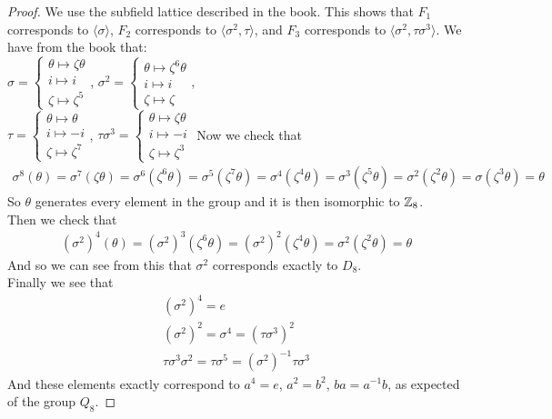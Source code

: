 \documentclass[num=11,duedate=04-21-21,course=Algebra\ II,proflastname=Walton]{hwtemplate}
\begin{document}
\begin{proof}

	We use the subfield lattice described in the book. This shows that $F_1$ corresponds to $\langle\sigma\rangle$, $F_2$ corresponds to $\langle\sigma^2, \tau\rangle$, and $F_3$ corresponds to $\langle\sigma^2, \tau\sigma^3\rangle$. We have from the book that:\\
$\sigma = \begin{cases}
    \theta \mapsto \zeta\theta\\
    i \mapsto i\\
    \zeta \mapsto \zeta^5
\end{cases}$, $\sigma^2 = \begin{cases}
    \theta \mapsto \zeta^6\theta\\
    i \mapsto i\\
    \zeta \mapsto \zeta
\end{cases}$, \\
$\tau = \begin{cases}
    \theta \mapsto \theta\\
    i \mapsto -i\\
    \zeta \mapsto \zeta^7
\end{cases}$, $\tau\sigma^3 = \begin{cases}
    \theta \mapsto \zeta\theta\\
    i \mapsto -i\\
    \zeta \mapsto \zeta^3
\end{cases}$
Now we check that
\begin{align*}
	\sigma^{8}(\theta ) = \sigma^{7}(\zeta \theta ) = \sigma ^{6}(\zeta^{6}\theta ) = \sigma^{5}(\zeta^{7}\theta )= \sigma^{4}(\zeta^{4}\theta ) = \sigma^{3}(\zeta^{5}\theta ) = \sigma^2(\zeta^2 \theta ) = \sigma ( \zeta^{3}\theta ) = \theta 
\end{align*}
So \(\theta \) generates every element in the group and it is then isomorphic to \(\mathbb{Z}_8\).\\

Then we check that
\begin{align*}
	(\sigma^2)^{4}(\theta ) = (\sigma ^2)^{3}(\zeta^{6}\theta) = (\sigma ^2)^2(\zeta ^{4}\theta ) = \sigma ^2(\zeta ^2 \theta ) = \theta 
\end{align*}
And so we can see from this that \(\sigma^2\) corresponds exactly to \(D_8\).\\

Finally we see that
\begin{align*}
	(\sigma^2)^{4} = e\\
	(\sigma ^2)^2 = \sigma^{4} = (\tau \sigma^3)^2\\
	\tau \sigma^3 \sigma ^2 = \tau \sigma^5 = (\sigma^2)^{-1} \tau  \sigma^3
\end{align*}
And these elements exactly correspond to \(a^{4}=e\), \(a^2=b^2\), \(ba = a^{-1}b\), as expected of the group \(Q_8\).

\end{proof}
\end{document}
